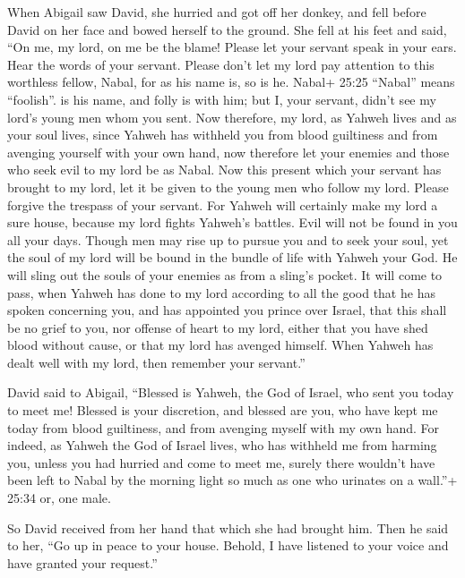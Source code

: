  When Abigail saw David, she hurried and got off her
donkey, and fell before David on her face and bowed herself to the
ground.  She fell at his feet and said, ``On me, my lord,
on me be the blame! Please let your servant speak in your ears. Hear the
words of your servant.  Please don't let my lord pay
attention to this worthless fellow, Nabal, for as his name is, so is he.
Nabal+ 25:25 ``Nabal'' means ``foolish''. is his name, and folly is with
him; but I, your servant, didn't see my lord's young men whom you sent.
 Now therefore, my lord, as Yahweh lives and as your soul
lives, since Yahweh has withheld you from blood guiltiness and from
avenging yourself with your own hand, now therefore let your enemies and
those who seek evil to my lord be as Nabal.  Now this
present which your servant has brought to my lord, let it be given to
the young men who follow my lord.  Please forgive the
trespass of your servant. For Yahweh will certainly make my lord a sure
house, because my lord fights Yahweh's battles. Evil will not be found
in you all your days.  Though men may rise up to pursue you
and to seek your soul, yet the soul of my lord will be bound in the
bundle of life with Yahweh your God. He will sling out the souls of your
enemies as from a sling's pocket.  It will come to pass,
when Yahweh has done to my lord according to all the good that he has
spoken concerning you, and has appointed you prince over Israel,
 that this shall be no grief to you, nor offense of heart
to my lord, either that you have shed blood without cause, or that my
lord has avenged himself. When Yahweh has dealt well with my lord, then
remember your servant.''

 David said to Abigail, ``Blessed is Yahweh, the God of
Israel, who sent you today to meet me!  Blessed is your
discretion, and blessed are you, who have kept me today from blood
guiltiness, and from avenging myself with my own hand.  For
indeed, as Yahweh the God of Israel lives, who has withheld me from
harming you, unless you had hurried and come to meet me, surely there
wouldn't have been left to Nabal by the morning light so much as one who
urinates on a wall.''+ 25:34 or, one male.

 So David received from her hand that which she had brought
him. Then he said to her, ``Go up in peace to your house. Behold, I have
listened to your voice and have granted your request.''

